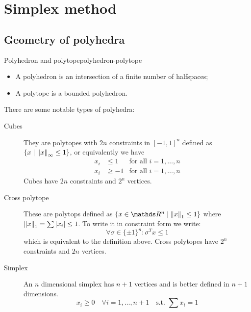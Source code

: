 \documentclass[12pt]{extarticle}
\begin{document}
\section{Simplex method}

\subsection{Geometry of polyhedra}

\begin{definition}{Polyhedron and polytope}{polyhedron-polytope}
	\begin{itemize}
		\item A polyhedron is an intersection of a finite number of halfspaces;
		\item A polytope is a bounded polyhedron.
	\end{itemize}
\end{definition}

There are some notable types of polyhedra:
\begin{description}
	\item[Cubes] They are polytopes with $2n$ constraints in $[-1, 1]^n$ defined as
	      $\{x \mid \norm{x}_\infty \leq 1\}$, or equivalently we have
	      \begin{align}
		      x_i & \leq 1  & \text{for all } i = 1, \dots, n \\
		      x_i & \geq -1 & \text{for all } i = 1, \dots, n
	      \end{align}
	      Cubes have $2n$ constraints and $2^n$ vertices.

	\item[Cross polytope] These are polytops defined as $\{ x \in \R^n \mid \norm{x}_1 \leq 1\}$
	      where $\norm{x}_1 = \sum \abs{x_i} \leq 1$.
	      To write it in constraint form we write:
	      \begin{equation}
		      \forall \sigma \in \{\pm 1\}^n : \sigma^T x \leq 1
	      \end{equation}
	      which is equivalent to the definition above.
	      Cross polytopes have $2^n$ constraints and $2n$ vertices.

	\item[Simplex] An $n$ dimensional simplex has $n + 1$ vertices and is better defined in
	      $n+1$ dimensions.
	      \begin{equation}
		      x_i \geq 0 \quad \forall i = 1, \dots, n+1 \quad \text{s.t. } \sum x_i = 1
	      \end{equation}
\end{description}
\end{document}
